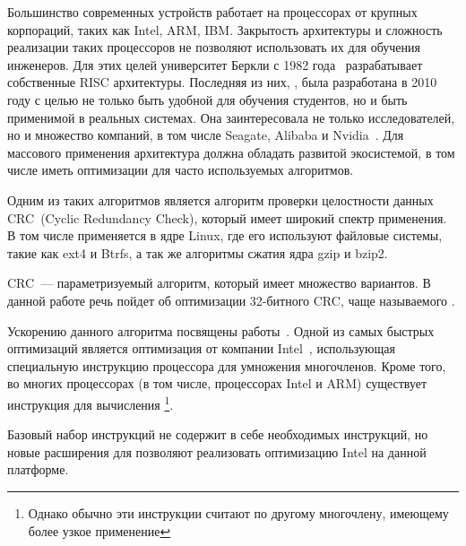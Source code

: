 

Большинство современных устройств работает на процессорах от крупных корпораций, таких как \textenglish{Intel, ARM, IBM}.
Закрытость архитектуры и сложность реализации таких процессоров не позволяют использовать их для обучения инженеров.
Для этих целей университет Беркли с 1982 года~\cite{Séquin:CSD-82-106} разрабатывает собственные \textenglish{RISC} архитектуры.
Последняя из них, \riscv{}, была разработана в 2010 году с целью не только быть удобной для обучения студентов, но и быть применимой в реальных системах.
Она заинтересовала не только исследователей, но и множество компаний, в том числе \textenglish{Seagate, Alibaba} и \textenglish{Nvidia}~\cite{RISCVpopularity}.
Для массового применения архитектура должна обладать развитой экосистемой, в том числе иметь оптимизации для часто используемых алгоритмов.

Одним из таких алгоритмов является алгоритм проверки целостности данных \textenglish{CRC~(Cyclic Redundancy Check)}, который имеет широкий спектр применения.
В том числе применяется в ядре \textenglish{Linux}, где его используют файловые системы, такие как \textenglish{ext4} и \textenglish{Btrfs}, а так же алгоритмы сжатия ядра \textenglish{gzip} и \textenglish{bzip2}.

\textenglish{CRC}~--- параметризуемый алгоритм, который имеет множество вариантов.
В данной работе речь пойдет об оптимизации 32-битного \textenglish{CRC}, чаще называемого \crctt{}.

Ускорению данного алгоритма посвящены работы~\cite{kadatch2010everything, fastestCRC32}.
Одной из самых быстрых оптимизаций является оптимизация от компании \textenglish{Intel}~\cite{gopal2009fast}, использующая специальную инструкцию процессора для умножения многочленов.
Кроме того, во многих процессорах (в том числе, процессорах \textenglish{Intel} и \textenglish{ARM}) существует инструкция для вычисления \crctt{}\footnote{Однако обычно эти инструкции считают \crctt{} по другому многочлену, имеющему более узкое применение}.

Базовый набор инструкций \riscv{} не содержит в себе необходимых инструкций, но новые расширения для \riscv{} позволяют реализовать оптимизацию \textenglish{Intel} на данной платформе. 

